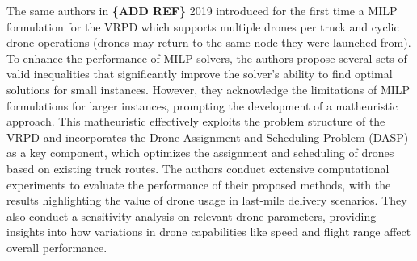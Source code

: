 \documentclass{article}
\begin{document}
	The same authors in \textbf{\{ADD REF\}} 2019 introduced for the first time a MILP formulation for the VRPD which supports multiple drones per truck and cyclic drone operations (drones may return to the same node they were launched from). To enhance the performance of MILP solvers, the authors propose several sets of valid inequalities that significantly improve the solver's ability to find optimal solutions for small instances. However, they acknowledge the limitations of MILP formulations for larger instances, prompting the development of a matheuristic approach. This matheuristic effectively exploits the problem structure of the VRPD and incorporates the Drone Assignment and Scheduling Problem (DASP) as a key component, which optimizes the assignment and scheduling of drones based on existing truck routes. The authors conduct extensive computational experiments to evaluate the performance of their proposed methods, with the results highlighting the value of drone usage in last-mile delivery scenarios. They also conduct a sensitivity analysis on relevant drone parameters, providing insights into how variations in drone capabilities like speed and flight range affect overall performance.
	\par
\end{document}
